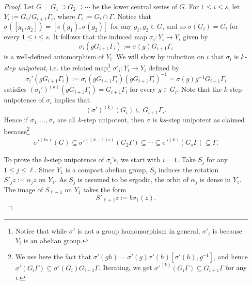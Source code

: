 \documentclass[11pt]{amsart}
\theoremstyle{definition}
\newcommand{\inv}{^{-1}}
\newcommand{\1}{{\mathbf{1}}}
\begin{document}
\begin{proof}
Let $G = G_1 \supseteq G_2 \supseteq \cdots$ be the lower central series of $G$. For $1\leq i\leq s$, let $Y_i := G_i/G_{i+1}\Gamma_i$, where $\Gamma_i:=G_i\cap \Gamma$.
Notice that $\sigma([g_1,g_2])=[\sigma(g_1),\sigma(g_2)]$ for any $g_1,g_2\in G$, and so $\sigma(G_i) = G_i$ for every $1\leq i\leq s$. It follows that the induced map $\sigma_i:Y_i \to Y_i$ given by 
$$\sigma_i(gG_{i+1}\Gamma_i) := \sigma(g)G_{i+1}\Gamma_i$$ 
is a well-defined automorphism of $Y_i$. We will show by induction on $i$ that $\sigma_i$ is \textit{$k$-step unipotent}, i.e. the related map\footnote{Notice that while $\sigma'$ is not a group homomorphism in general, $\sigma'_i$ is because $Y_i$ is an abelian group.} $\sigma'_i:Y_i \to Y_i$ defined by $$\sigma_i'(gG_{i+1}\Gamma_i):= \sigma_i(gG_{i+1}\Gamma_i)(gG_{i+1}\Gamma_i)\inv =\sigma(g)g\inv G_{i+1}\Gamma_i$$ satisfies $(\sigma_i')^{(k)}(gG_{i+1}\Gamma_i) = G_{i+1}\Gamma_i$ for every $g\in G_i$. Note that the $k$-step unipotence of $\sigma_i$ implies that $$(\sigma')^{(k)}(G_i)\subseteq G_{i+1}\Gamma_i.$$ Hence if $\sigma_1,\ldots, \sigma_s$ are all $k$-step unipotent, then $\sigma$ is $ks$-step unipotent as claimed because\footnote{We use here the fact that $\sigma'(gh) = \sigma'(g)\sigma'(h)[\sigma'(h),g\inv]$, and hence $\sigma'(G_i\Gamma)\subseteq \sigma'(G_i) G_{i+1}\Gamma$. Iterating, we get 
    $\sigma'^{(k)}(G_i\Gamma)\subseteq G_{i+1}\Gamma$ for any $i$.}
\begin{align*}
    {\sigma'}^{(ks)}(G)\subseteq {\sigma'}^{((k-1)s)}(G_2\Gamma)\subseteq \cdots \subseteq\sigma'^{(k)}(G_s\Gamma)\subseteq \Gamma.
\end{align*}

To prove the $k$-step unipotence of $\sigma_i$'s, we start with $i=1$. Take $S_j$ for any $1\leq j\leq \ell$. Since $Y_1$ is a compact abelian group, $S_j$ induces the rotation 
${S'_j} z := \alpha_j z$ on $Y_1$. 
As $S_j$ is assumed to be ergodic, the orbit of $\alpha_j$ is dense in ${Y_1}$. 
The image of $S_{\ell+1}$ on ${Y_1}$ takes the form
$${S'_{\ell+1}}z := b\sigma_1(z).$$


\end{proof}
\end{document}
